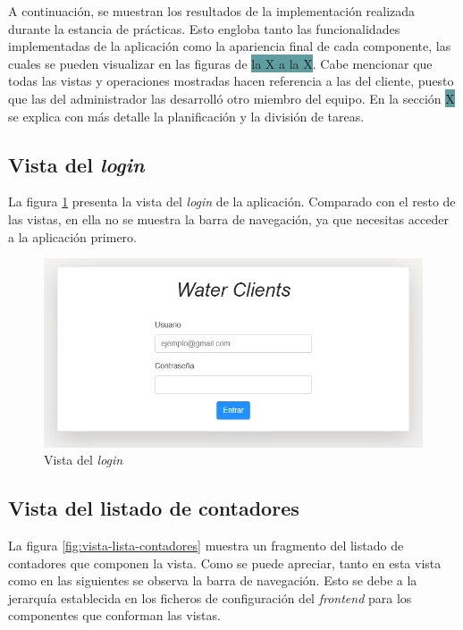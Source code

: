 \documentclass[pdftex,11pt,a4paper]{book}
\begin{document}
A continuación, se muestran los resultados de la implementación realizada durante la estancia de prácticas. Esto engloba tanto las funcionalidades implementadas de la aplicación como la apariencia final de cada componente, las cuales se pueden visualizar en las figuras de \colorbox{CadetBlue}{la X a la X}. Cabe mencionar que todas las vistas y operaciones mostradas hacen referencia a las del cliente, puesto que las del administrador las desarrolló otro miembro del equipo. En la sección \colorbox{CadetBlue}{X} se explica con más detalle la planificación y la división de tareas. 

\subsection{Vista del \textit{login}}

La figura \ref{fig:vista-login} presenta la vista del \textit{login} de la aplicación. Comparado con el resto de las vistas, en ella no se muestra la barra de navegación, ya que necesitas acceder a la aplicación primero.

\begin{figure}[h]
 \centering
 \includegraphics [scale=0.75] {images/vistas/login.png}
 \caption{Vista del \textit{login}} \label{fig:vista-login}
 \end{figure}

\subsection{Vista del listado de contadores}

La figura \ref{fig:vista-lista-contadores}  muestra un fragmento del listado de contadores que componen la vista. Como se puede apreciar, tanto en esta vista como en las siguientes se observa la barra de navegación. Esto se debe a la jerarquía establecida en los ficheros de configuración del \textit{frontend} para los componentes que conforman las vistas.
\end{document}
